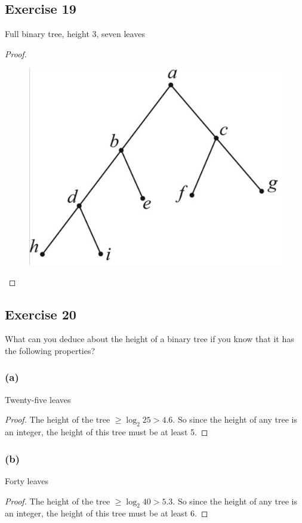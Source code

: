 \documentclass[14pt]{extarticle}
\begin{document}
\subsection{Exercise 19}
Full binary tree, height 3, seven leaves
\begin{proof}
    \begin{figure}[ht!]
        \centering
        \includegraphics[scale=0.15]{../images/10.5.16.png}
    \end{figure}
\end{proof}

\subsection{Exercise 20}
What can you deduce about the height of a binary tree if you know that it has the following properties?

\subsubsection{(a)}
Twenty-five leaves
\begin{proof}
    The height of the tree \(\geq \log_2 25 > 4.6\). So since the height of any tree is an integer, the height of this tree must
    be at least 5.
\end{proof}

\subsubsection{(b)}
Forty leaves
\begin{proof}
    The height of the tree \(\geq \log_2 40 > 5.3\). So since the height of any tree is an integer, the height of this tree must
    be at least 6.
\end{proof}
\end{document}
